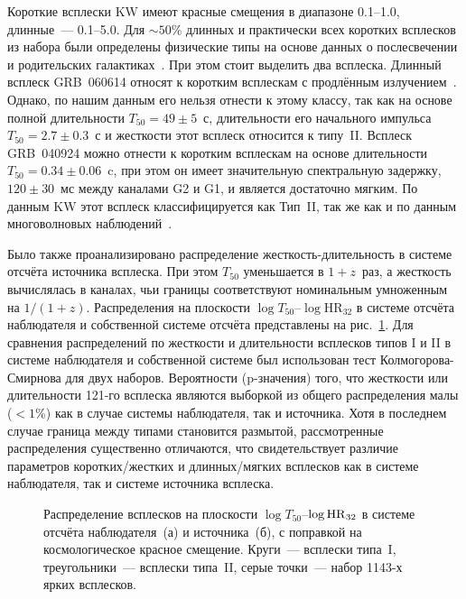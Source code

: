 Короткие всплески KW имеют красные смещения в диапазоне 0.1--1.0, длинные~--- 0.1--5.0.
Для $\sim 50$\% длинных и практически всех коротких всплесков из набора были 
определены физические типы на основе данных о послесвечении и родительских 
галактиках~\citep{Zhang_2009, Kann_2010ApJ, Kann_2011ApJ}.
При этом стоит выделить два всплеска. 
Длинный всплеск GRB~060614 относят к коротким всплескам с продлённым излучением~\citep{Gehrels_2006_Nature}. 
Однако, по нашим данным его нельзя отнести к этому классу, так как на основе полной 
длительности $T_{50} = 49 \pm 5$~с, длительности его начального импульса 
$T_{50} = 2.7\pm 0.3$~с и жесткости этот всплеск относится к типу~II.
Всплеск GRB~040924 можно отнести к коротким всплескам на основе длительности $T_{50} = 0.34\pm0.06$~c, 
при этом он имеет значительную спектральную задержку, $120 \pm 30$~мс между каналами G2 и G1, 
и является достаточно мягким. По данным KW этот всплеск классифицируется как Тип~II, 
так же как и по данным многоволновых наблюдений~\citep{Zhang_2009}.

Было также проанализировано распределение  жесткость-длительность в системе 
отсчёта источника всплеска. При этом $T_{50}$ уменьшается в $1+z$~раз, а жесткость 
вычислялась в каналах, чьи границы соответствуют номинальным умноженным на $1/(1+z)$. 
Распределения на плоскости $\log T_{50}$--$\log \mbox{HR}_{32}$ в системе отсчёта наблюдателя 
и собственной системе отсчёта представлены на рис.~\ref{img:T50HRzCorr}. 
Для сравнения распределений по жесткости и длительности всплесков типов I и II
в системе наблюдателя и собственной системе был использован тест Колмогорова-Смирнова для двух наборов. 
Вероятности (p-значения) того, что жесткости или длительности 
121-го всплеска являются выборкой из общего распределения малы ($<1$\%) 
как в случае системы наблюдателя, так и источника. Хотя в последнем случае
граница между типами становится размытой, рассмотренные распределения существенно отличаются,
что свидетельствует различие параметров коротких/жестких и длинных/мягких всплесков как 
в системе наблюдателя, так и системе источника всплеска. 

\begin{figure}[h]
  \begin{minipage}[h]{0.5\textwidth}
  \end{minipage}
  \hfill
  \begin{minipage}[h]{0.5\textwidth}
  \end{minipage}
  \caption{Распределение всплесков на плоскости $\log T_{50}$--$\log {\mathrm{HR}}_{32}$ 
  в системе отсчёта наблюдателя~(а) и источника~(б), с поправкой на космологическое красное смещение. 
  Круги~--- всплески типа~I, треугольники~--- всплески типа~II, 
  серые точки~--- набор 1143-х ярких всплесков.
  }
  \label{img:T50HRzCorr}  
\end{figure}

